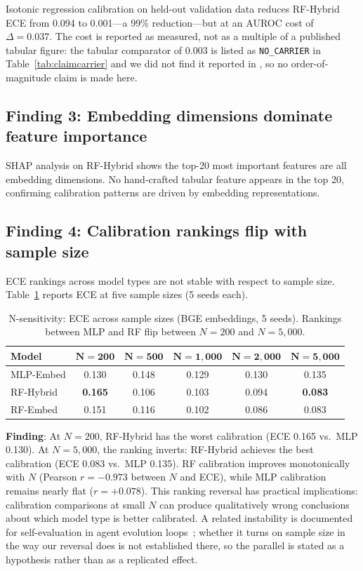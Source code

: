 \documentclass[11pt]{article}
\begin{document}
Isotonic regression calibration on held-out validation data reduces RF-Hybrid ECE from 0.094 to 0.001---a 99\% reduction---but at an AUROC cost of $\Delta{=}0.037$. The cost is reported as measured, not as a multiple of a published tabular figure: the tabular comparator of $0.003$ is listed as \texttt{NO\_CARRIER} in Table~\ref{tab:claimcarrier} and we did not find it reported in \citet{wang2021revisiting}, so no order-of-magnitude claim is made here.

\subsection{Finding 3: Embedding dimensions dominate feature importance}

SHAP analysis on RF-Hybrid shows the top-20 most important features are all embedding dimensions. No hand-crafted tabular feature appears in the top 20, confirming calibration patterns are driven by embedding representations.

\subsection{Finding 4: Calibration rankings flip with sample size}

ECE rankings across model types are not stable with respect to sample size. Table~\ref{tab:n_sensitivity} reports ECE at five sample sizes (5 seeds each).

\begin{table}[H]
\centering
\caption{N-sensitivity: ECE across sample sizes (BGE embeddings, 5 seeds). Rankings between MLP and RF flip between $N{=}200$ and $N{=}5{,}000$.}
\label{tab:n_sensitivity}
\footnotesize
\begin{tabular}{@{}lccccc@{}}
\toprule
\textbf{Model} & $\mathbf{N{=}200}$ & $\mathbf{N{=}500}$ & $\mathbf{N{=}1{,}000}$ & $\mathbf{N{=}2{,}000}$ & $\mathbf{N{=}5{,}000}$ \\
\midrule
MLP-Embed  & 0.130 & 0.148 & 0.129 & 0.130 & 0.135 \\
RF-Hybrid  & \textbf{0.165} & 0.106 & 0.103 & 0.094 & \textbf{0.083} \\
RF-Embed   & 0.151 & 0.116 & 0.102 & 0.086 & 0.083 \\
\bottomrule
\end{tabular}
\end{table}

\textbf{Finding}: At $N{=}200$, RF-Hybrid has the worst calibration (ECE 0.165 vs.\ MLP 0.130). At $N{=}5{,}000$, the ranking inverts: RF-Hybrid achieves the best calibration (ECE 0.083 vs.\ MLP 0.135). RF calibration improves monotonically with $N$ (Pearson $r{=}{-}0.973$ between $N$ and ECE), while MLP calibration remains nearly flat ($r{=}{+}0.078$). This ranking reversal has practical implications: calibration comparisons at small $N$ can produce qualitatively wrong conclusions about which model type is better calibrated. A related instability is documented for self-evaluation in agent evolution loops~\citep{liu2026epc}; whether it turns on sample size in the way our reversal does is not established there, so the parallel is stated as a hypothesis rather than as a replicated effect.
\end{document}
